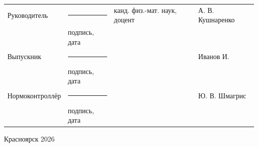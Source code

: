 \begin{titlepage}
\noindent
\begin{tabular}{@{} p{} >{\centering\arraybackslash} p{} p{} p{} @{}}
	Руководитель     & \rule{3.5cm}{.1pt}          & канд. физ.-мат. наук, доцент & А. В. Кушнаренко \\[-1ex]
	& {\scriptsize подпись, дата} &                   &                  \\[2ex]
	Выпускник & \rule{3.5cm}{.1pt} & & Иванов И. \\[-1ex]
	& {\scriptsize подпись, дата} &                   &                  \\[2ex]
	Нормоконтроллёр  & \rule{3.5cm}{.1pt}          &                   & Ю. В. Шмагрис \\[-1ex]
	& {\scriptsize подпись, дата} &                   &                  \\
\end{tabular}

\vfill
\begin{center}Красноярск 2026\end{center}
\end{titlepage}
\restoregeometry